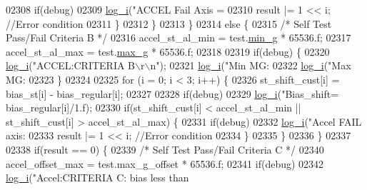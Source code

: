 \begin{DoxyCode}
{{{{{{{{{{{02308                 \textcolor{keywordflow}{if}(debug)
02309                     \hyperlink{inv__mpu_8c_a67fc07fa528d8e62dc7b88a847b563f5}{log\_i}(\textcolor{stringliteral}{"ACCEL Fail Axis = %
02310                 result |= 1 << i;   \textcolor{comment}{//Error condition}
02311             \}
02312         \}
02313     \}
02314     \textcolor{keywordflow}{else} \{
02315         \textcolor{comment}{/* Self Test Pass/Fail Criteria B */}
02316         accel\_st\_al\_min = test.\hyperlink{structtest__s_aa295cc026745ef7378eeff0c72638ed0}{min\_g} * 65536.f;
02317         accel\_st\_al\_max = test.\hyperlink{structtest__s_a30dbaf47c9d41bf9e86370664d661bd0}{max\_g} * 65536.f;
02318 
02319         \textcolor{keywordflow}{if}(debug) \{
02320             \hyperlink{inv__mpu_8c_a67fc07fa528d8e62dc7b88a847b563f5}{log\_i}(\textcolor{stringliteral}{"ACCEL:CRITERIA B\(\backslash\)r\(\backslash\)n"});
02321             \hyperlink{inv__mpu_8c_a67fc07fa528d8e62dc7b88a847b563f5}{log\_i}(\textcolor{stringliteral}{"Min MG: %
02322             \hyperlink{inv__mpu_8c_a67fc07fa528d8e62dc7b88a847b563f5}{log\_i}(\textcolor{stringliteral}{"Max MG: %
02323         \}
02324 
02325         \textcolor{keywordflow}{for} (i = 0; i < 3; i++) \{
02326             st\_shift\_cust[i] = bias\_st[i] - bias\_regular[i];
02327 
02328             \textcolor{keywordflow}{if}(debug)
02329                 \hyperlink{inv__mpu_8c_a67fc07fa528d8e62dc7b88a847b563f5}{log\_i}(\textcolor{stringliteral}{"Bias\_shift=%
       bias\_regular[i]/1.f);
02330             \textcolor{keywordflow}{if}(st\_shift\_cust[i] < accel\_st\_al\_min || st\_shift\_cust[i] > accel\_st\_al\_max) \{
02331                 \textcolor{keywordflow}{if}(debug)
02332                     \hyperlink{inv__mpu_8c_a67fc07fa528d8e62dc7b88a847b563f5}{log\_i}(\textcolor{stringliteral}{"Accel FAIL axis:%
02333                 result |= 1 << i;   \textcolor{comment}{//Error condition}
02334             \}
02335         \}
02336     \}
02337 
02338     \textcolor{keywordflow}{if}(result == 0) \{
02339     \textcolor{comment}{/* Self Test Pass/Fail Criteria C */}
02340         accel\_offset\_max = test.max\_g\_offset * 65536.f;
02341         \textcolor{keywordflow}{if}(debug)
02342             \hyperlink{inv__mpu_8c_a67fc07fa528d8e62dc7b88a847b563f5}{log\_i}(\textcolor{stringliteral}{"Accel:CRITERIA C: bias less than %
}}}}}}}}}}}}}}}}}
\end{DoxyCode}
